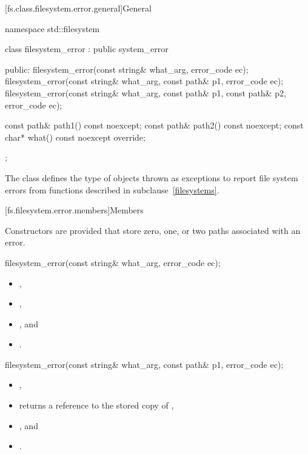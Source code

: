 [fs.class.filesystem.error.general]{General}

%
\begin{codeblock}
namespace std::filesystem {
  class filesystem_error : public system_error {
  public:
    filesystem_error(const string& what_arg, error_code ec);
    filesystem_error(const string& what_arg,
                     const path& p1, error_code ec);
    filesystem_error(const string& what_arg,
                     const path& p1, const path& p2, error_code ec);

    const path& path1() const noexcept;
    const path& path2() const noexcept;
    const char* what() const noexcept override;
  };
}
\end{codeblock}
\pnum
The class  defines the type of
objects thrown as exceptions to report file system errors from functions described in
subclause~\ref{filesystems}.

[fs.filesystem.error.members]{Members}

\pnum
 Constructors are provided that store zero, one, or two paths associated with
an error.

%
\begin{itemdecl}
filesystem_error(const string& what_arg, error_code ec);
\end{itemdecl}

\begin{itemdescr}
\pnum
\ensures
\begin{itemize}
\item {},
\item {},
\item {}, and
\item {} .
\end{itemize}
\end{itemdescr}

%
\begin{itemdecl}
filesystem_error(const string& what_arg, const path& p1, error_code ec);
\end{itemdecl}

\begin{itemdescr}
\pnum
\ensures
\begin{itemize}
\item {},
\item {} returns a reference to the stored copy of ,
\item {}, and
\item {} .
\end{itemize}
\end{itemdescr}

